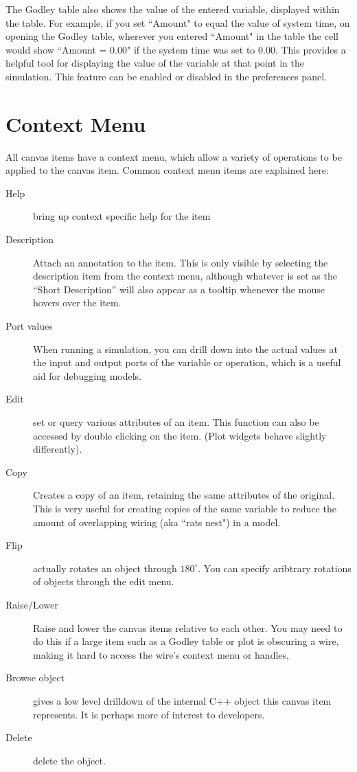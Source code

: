 The Godley table also shows the value of the entered variable, displayed within the table.
For example, if you set ``Amount" to equal the value of system time, on opening
the Godley table, wherever you entered ``Amount" in the table the cell would show
``Amount = 0.00" if the system time was set to 0.00. This provides a helpful
tool for displaying the value of the variable at that point in the simulation.
This feature can be enabled or disabled in the preferences panel.

\section{Context Menu}

All canvas items have a context menu, which allow a variety of
operations to be applied to the canvas item. Common context menu items
are explained here:
\begin{description}
\item[Help] bring up context specific help for the item
\item[Description] Attach an annotation to the item. This is only
visible by selecting the description item from the context menu,
although whatever is set as the ``Short Description'' will also appear
as a tooltip whenever the mouse hovers over the item.
\item[Port values] When running a simulation, you can drill down into
the actual values at the input and output ports of the variable or
operation, which is a useful aid for debugging models.
\item[Edit] set or query various attributes of an item. This function
can also be accessed by double clicking on the item. (Plot widgets
behave slightly differently).
\item[Copy] Creates a copy of an item, retaining the same attributes
of the original. This is very useful for creating copies of the same
variable to reduce the amount of overlapping wiring (aka ``rats nest")
in a model.
\item[Flip] actually rotates an object through $180^\circ$. You can
specify aribtrary rotations of objects through the edit menu.
\item[Raise/Lower] Raise and lower the canvas items relative to each
other. You may need to do this if a large item such as a Godley table
or plot is obscuring a wire, making it hard to access the wire's
context menu or handles,
\item[Browse object] gives a low level drilldown of the internal C++
object this canvas item represents. It is perhaps more of interest to
developers. 
\item[Delete] delete the object.
\end{description}

